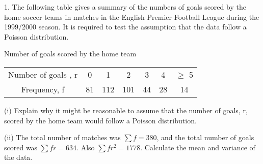 \documentclass[a4paper,12pt]{article}
\begin{document}
\begin{framed}
1. The following table gives a summary of the numbers of goals scored by the home soccer teams in matches in the English Premier Football League during the 1999/2000 season.  It is required to test the assumption that the data follow a Poisson distribution. 
 

Number of goals scored by the home team
\begin{center}
\begin{tabular}{|c||c|c|c|c|c|c|}
Number of goals , r & 0 & 1 & 2 & 3 & 4 & $\geq$ 5\\ Frequency, f & 81 & 112 & 101 & 44 & 28 & 14 \\
\end{tabular}
\end{center}
 
 
(i) Explain why it might be reasonable to assume that the number of goals, r, scored by the home team would follow a Poisson distribution. 
 
(ii) The total number of matches was $\sum f = 380$, and the total number of goals scored was $\sum fr = 634$.  Also $\sum fr^2 = 1778$.  Calculate the mean and variance of the data.  
\end{framed}
\end{document}
